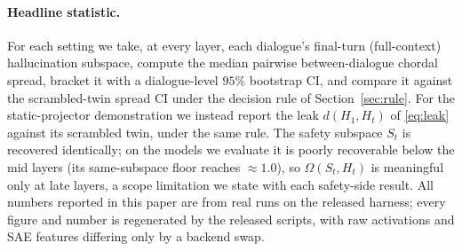 \paragraph{Headline statistic.} For each setting we take, at every layer, each dialogue's
final-turn (full-context) hallucination subspace, compute the median pairwise
between-dialogue chordal spread, bracket it with a dialogue-level $95\%$ bootstrap CI, and
compare it against the scrambled-twin spread CI under the decision rule of
Section~\ref{sec:rule}. For the static-projector demonstration we instead report the leak
$d(H_1, H_t)$ of \eqref{eq:leak} against its scrambled twin, under the same rule. The
safety subspace $S_t$ is recovered identically; on the models we evaluate it is poorly
recoverable below the mid layers (its same-subspace floor reaches $\approx 1.0$), so
$\Omega(S_t, H_t)$ is meaningful only at late layers, a scope limitation we state with each
safety-side result. All numbers reported in this paper are from real runs on the released
harness; every figure and number is regenerated by the released scripts, with raw
activations and SAE features differing only by a backend swap.